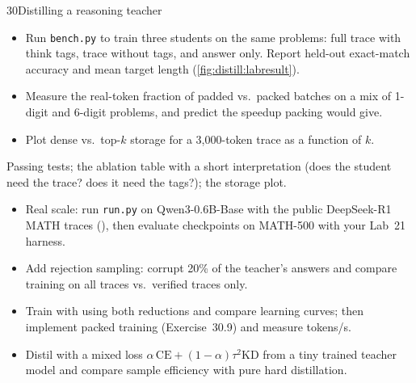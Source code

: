 \begin{labbox}{30}{Distilling a reasoning teacher}
\begin{itemize}
\item Run \texttt{bench.py} to train three students on the same problems: full trace with think
tags, trace without tags, and answer only. Report held-out exact-match accuracy and mean target
length (\cref{fig:distill:labresult}).
\item Measure the real-token fraction of padded vs.\ packed batches on a mix of 1-digit and 6-digit
problems, and predict the speedup packing would give.
\item Plot dense vs.\ top-$k$ storage for a 3{,}000-token trace as a function of $k$.
\end{itemize}

Passing tests; the ablation table with a short interpretation (does the student need the trace?
does it need the tags?); the storage plot.

\begin{itemize}
\item Real scale: run \texttt{run.py} on Qwen3-0.6B-Base with the public DeepSeek-R1 MATH traces
(), then evaluate checkpoints on MATH-500 with your
Lab~21 harness.
\item Add rejection sampling: corrupt 20\% of the teacher's answers and compare training on all
traces vs.\ verified traces only.
\item Train with  using both reductions and compare learning curves; then
implement packed training (Exercise~30.9) and measure tokens/s.
\item Distil with a mixed loss $\alpha\,\text{CE}+(1-\alpha)\tau^2\text{KD}$ from a tiny trained
teacher model and compare sample efficiency with pure hard distillation.
\end{itemize}
\end{labbox}
